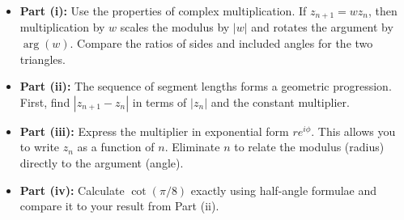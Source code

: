 \begin{hint}
\begin{itemize}
  \item \textbf{Part (i):} Use the properties of complex multiplication. If $z_{n+1} = w z_n$, then multiplication by $w$ scales the modulus by $|w|$ and rotates the argument by $\arg(w)$. Compare the ratios of sides and included angles for the two triangles.
  \item \textbf{Part (ii):} The sequence of segment lengths forms a geometric progression. First, find $|z_{n+1} - z_n|$ in terms of $|z_n|$ and the constant multiplier.
  \item \textbf{Part (iii):} Express the multiplier in exponential form $r e^{i\phi}$. This allows you to write $z_n$ as a function of $n$. Eliminate $n$ to relate the modulus (radius) directly to the argument (angle).
  \item \textbf{Part (iv):} Calculate $\cot(\pi/8)$ exactly using half-angle formulae and compare it to your result from Part (ii).
\end{itemize}
\end{hint}

